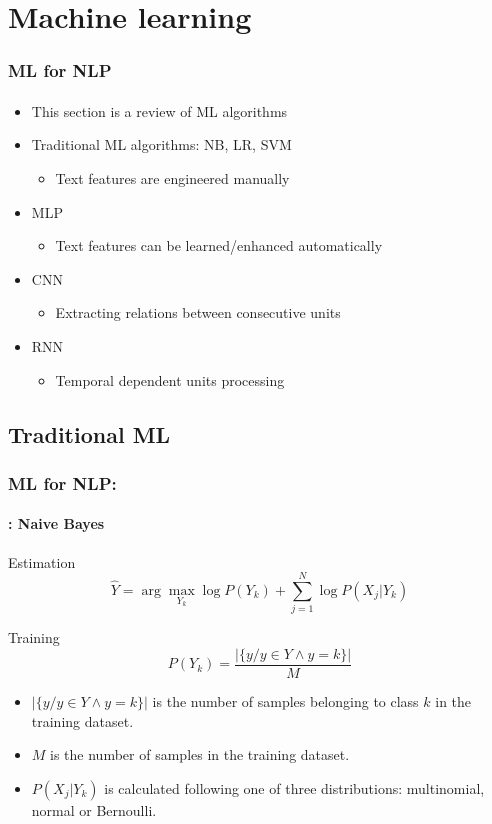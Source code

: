 \documentclass[xcolor=table]{beamer}
\begin{document}
	\section{Machine learning}
	
	\begin{frame}
		\frametitle{ML for NLP}
		\framesubtitle{\insertsection}
		
		\begin{itemize}
			\item This section is a review of ML algorithms
			\item Traditional ML algorithms: NB, LR, SVM
			\begin{itemize}
				\item Text features are engineered manually
			\end{itemize}
			\item MLP
			\begin{itemize}
				\item Text features can be learned/enhanced automatically
			\end{itemize}
			\item CNN
			\begin{itemize}
				\item Extracting relations between consecutive units
			\end{itemize}
			\item RNN
			\begin{itemize}
				\item Temporal dependent units processing
			\end{itemize}
		\end{itemize}
		
	\end{frame}
	
	\subsection{Traditional ML}
	
	\begin{frame}
		\frametitle{ML for NLP: \insertsection}
		\framesubtitle{\insertsubsection: Naive Bayes}
		
		Estimation 
		\[\hat{Y} = \arg\max_{Y_k} \log P(Y_k) + \sum_{j=1}^{N} \log P(X_j|Y_k)\]
		
		Training
		\[P(Y_k) = \frac{|\{y / y \in Y \wedge y = k\}|}{M}\]
		
		\begin{itemize}
			\item $|\{y / y \in Y \wedge y = k\}|$ is the number of samples belonging to class $k$ in the training dataset.
			\item $M$ is the number of samples in the training dataset.
			\item $P(X_j|Y_k)$ is calculated following one of three distributions: multinomial, normal or Bernoulli.
		\end{itemize}
		
	\end{frame}
	
\end{document}
